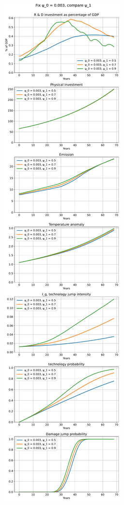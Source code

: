 \documentclass{article}
\begin{document}
	\begin{figure}
		\centering
		\includegraphics{../figures/psi_0_0.003.pdf}
	\end{figure}
\end{document}
